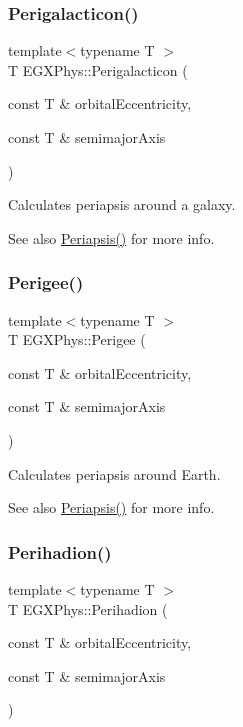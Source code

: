 \subsubsection{\texorpdfstring{Perigalacticon()}{Perigalacticon()}}
{\footnotesize\ttfamily template$<$typename T $>$ \\
T E\+G\+X\+Phys\+::\+Perigalacticon (\begin{DoxyParamCaption}\item[{const T \&}]{orbital\+Eccentricity,  }\item[{const T \&}]{semimajor\+Axis }\end{DoxyParamCaption})}



Calculates periapsis around a galaxy. 

\begin{DoxySeeAlso}{See also}
\hyperlink{group___astrophysics_ga4414ac75539371ec874a3d25cad6c9fe}{Periapsis()} for more info. 
\end{DoxySeeAlso}
\mbox{\label{group___astrophysics_gae2d053caf69cb0b4c3207064a2ab143a}} 
\subsubsection{\texorpdfstring{Perigee()}{Perigee()}}
{\footnotesize\ttfamily template$<$typename T $>$ \\
T E\+G\+X\+Phys\+::\+Perigee (\begin{DoxyParamCaption}\item[{const T \&}]{orbital\+Eccentricity,  }\item[{const T \&}]{semimajor\+Axis }\end{DoxyParamCaption})}



Calculates periapsis around Earth. 

\begin{DoxySeeAlso}{See also}
\hyperlink{group___astrophysics_ga4414ac75539371ec874a3d25cad6c9fe}{Periapsis()} for more info. 
\end{DoxySeeAlso}
\mbox{\label{group___astrophysics_gafb16e46e55078b38604eef0d7c7c40c4}} 
\subsubsection{\texorpdfstring{Perihadion()}{Perihadion()}}
{\footnotesize\ttfamily template$<$typename T $>$ \\
T E\+G\+X\+Phys\+::\+Perihadion (\begin{DoxyParamCaption}\item[{const T \&}]{orbital\+Eccentricity,  }\item[{const T \&}]{semimajor\+Axis }\end{DoxyParamCaption})}




